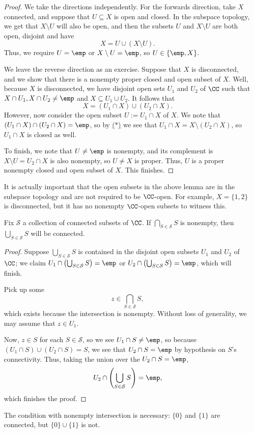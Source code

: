 \begin{proof}
	We take the directions independently. For the forwards direction, take $X$ connected, and suppose that $U\subseteq X$ is open and closed. In the subspace topology, we get that $X\setminus U$ will also be open, and then the subsets $U$ and $X\setminus U$ are both open, disjoint and have
	\[X=U\cup(X\setminus U).\]
	Thus, we require $U=\emp$ or $X\setminus U=\emp$, so $U\in\{\emp,X\}$.

	We leave the reverse direction as an exercise. Suppose that $X$ is disconnected, and we show that there is a nonempty proper closed and open subset of $X$. Well, because $X$ is disconnected, we have disjoint open sets $U_1$ and $U_2$ of $\CC$ such that $X\cap U_1,X\cap U_2\ne\emp$ and $X\subseteq U_1\cup U_2$. It follows that
	\[X=(U_1\cap X)\cup(U_2\cap X).\tag{$*$}\label{eq:xdisconnect}\]
	However, now consider the open subset $U:=U_1\cap X$ of $X$. We note that $(U_1\cap X)\cap(U_2\cap X)=\emp$, so by \hyperref[eq:xdisconnect]{($*$)} we see that $U_1\cap X=X\setminus(U_2\cap X)$, so $U_1\cap X$ is closed as well.

	To finish, we note that $U\ne\emp$ is nonempty, and its complement is $X\setminus U=U_2\cap X$ is also nonempty, so $U\ne X$ is proper. Thus, $U$ is a proper nonempty closed and open subset of $X$. This finishes.
\end{proof}
\begin{remark}[Nir]
	It is actually important that the open subsets in the above lemma are in the subspace topology and are not required to be $\CC$-open. For example, $X=\{1,2\}$ is disconnected, but it has no nonempty $\CC$-open subsets to witness this.
\end{remark}
\begin{lemma}
	Fix $\mathcal S$ a collection of connected subsets of $\CC$. If $\bigcap_{S\in\mathcal S}S$ is nonempty, then $\bigcup_{S\in\mathcal S}S$ will be connected.
\end{lemma}
\begin{proof}
	Suppose $\bigcup_{S\in\mathcal S}S$ is contained in the disjoint open subsets $U_1$ and $U_2$ of $\CC$; we claim $U_1\cap\left(\bigcup_{S\in\mathcal S}S\right)=\emp$ or $U_2\cap\left(\bigcup_{S\in\mathcal S}S\right)=\emp$, which will finish.
	
	Pick up some
	\[z\in\bigcap_{S\in\mathcal S}S,\]
	which exists because the intersection is nonempty. Without loss of generality, we may assume that $z\in U_1$.

	Now, $z\in S$ for each $S\in\mathcal S$, so we see $U_1\cap S\ne\emp$, so because $(U_1\cap S)\cup(U_2\cap S)=S$, we see that $U_2\cap S=\emp$ by hypothesis on $S$'s connectivity. Thus, taking the union over the $U_2\cap S=\emp$,
	\[U_2\cap\left(\bigcup_{S\in\mathcal S}S\right)=\emp,\]
	which finishes the proof.
\end{proof}
\begin{remark}
	The condition with nonempty intersection is necessary: $\{0\}$ and $\{1\}$ are connected, but $\{0\}\cup\{1\}$ is not.
\end{remark}